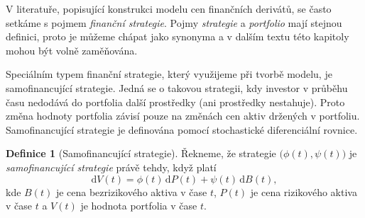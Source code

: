 \documentclass[a4paper,12pt]{report}
\theoremstyle{definition} \newtheorem{definice}[veta]{Definice}
\theoremstyle{remark}
\begin{document}


V literatuře, popisující konstrukci modelu cen finančních derivátů, se často setkáme s pojmem \textit{finanční strategie}.
Pojmy \textit{strategie} a \textit{portfolio} mají stejnou definici, proto je můžeme chápat jako synonyma a v dalším textu této kapitoly mohou být volně zaměňována.

Speciálním typem finanční strategie, který využijeme při tvorbě modelu, je samofinancující strategie.
Jedná se o takovou strategii, kdy investor v průběhu času nedodává do portfolia další prostředky (ani prostředky nestahuje).
Proto změna hodnoty portfolia závisí pouze na změnách cen aktiv držených v portfoliu. 
Samofinancující strategie je definována pomocí stochastické diferenciální rovnice.
\begin{definice}[Samofinancující strategie]\label{samofinancujici_strategie}
Řekneme, že strategie $\big(\phi(t),\psi(t)\big)$ je \textit{samofinancující strategie} právě tehdy, když platí
\begin{equation}\label{samofinancujici_strategie_vztah}
\mathrm{d}V(t)=\phi(t)\,\mathrm{d}P(t)+\psi(t)\,\mathrm{d}B(t),
\end{equation}
kde $B(t)$ je cena bezrizikového aktiva v čase $t$, $P(t)$ je cena rizikového aktiva v čase $t$ a $V(t)$ je hodnota portfolia v čase $t$.
\end{definice}
\end{document}

